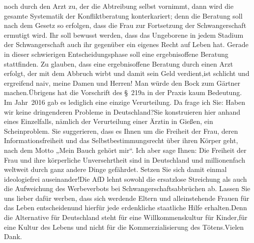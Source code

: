 \documentclass{article}
\begin{document}
noch durch den Arzt zu, der die Abtreibung selbst vornimmt, dann wird die gesamte Systematik der Konfliktberatung konterkariert; denn die Beratung soll nach dem Gesetz so erfolgen, dass die Frau zur Fortsetzung der Schwangerschaft ermutigt wird. Ihr soll bewusst werden, dass das Ungeborene in jedem Stadium der Schwangerschaft auch ihr gegenüber ein eigenes Recht auf Leben hat. Gerade in dieser schwierigen Entscheidungsphase soll eine ergebnisoffene Beratung stattfinden. Zu glauben, dass eine ergebnisoffene Beratung durch einen Arzt erfolgt, der mit dem Abbruch wirbt und damit sein Geld verdient,ist schlicht und ergreifend naiv, meine Damen und Herren! Man würde den Bock zum Gärtner machen.Übrigens hat die Vorschrift des § 219a in der Praxis kaum Bedeutung. Im Jahr 2016 gab es lediglich eine einzige Verurteilung. Da frage ich Sie: Haben wir keine dringenderen Probleme in Deutschland?Sie konstruieren hier anhand eines Einzelfalls, nämlich der Verurteilung einer Ärztin in Gießen, ein Scheinproblem. Sie suggerieren, dass es Ihnen um die Freiheit der Frau, deren Informationsfreiheit und das Selbstbestimmungsrecht über ihren Körper geht, nach dem Motto „Mein Bauch gehört mir“. Ich aber sage Ihnen: Die Freiheit der Frau und ihre körperliche Unversehrtheit sind in Deutschland und millionenfach weltweit durch ganz andere Dinge gefährdet. Setzen Sie sich damit einmal ideologiefrei auseinander!Die AfD lehnt sowohl die ersatzlose Streichung als auch die Aufweichung des Werbeverbots bei Schwangerschaftsabbrüchen ab. Lassen Sie uns lieber dafür werben, dass sich werdende Eltern und alleinstehende Frauen für das Leben entscheidenund hierfür jede erdenkliche staatliche Hilfe erhalten.Denn die Alternative für Deutschland steht für eine Willkommenskultur für Kinder,für eine Kultur des Lebens und nicht für die Kommerzialisierung des Tötens.Vielen Dank.
\end{document}
